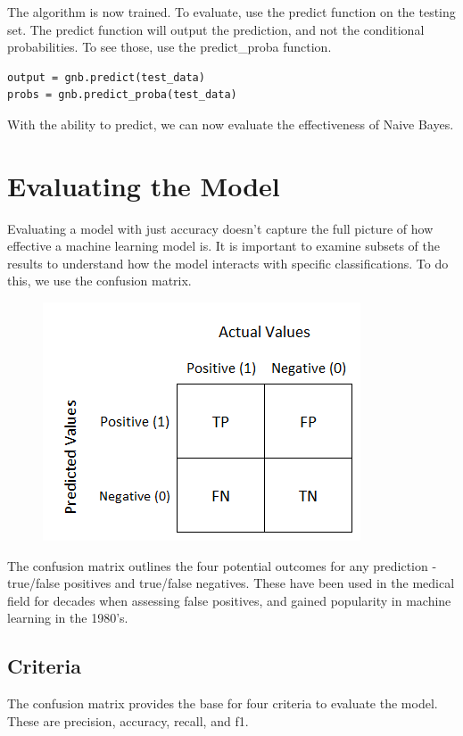 \documentclass[11pt, twoside, reqno]{book}
\begin{document}
The algorithm is now trained. To evaluate, use the predict function on the testing set. The predict function will output the prediction, and not the conditional probabilities. To see those, use the predict\_proba function. 
\begin{verbatim}
output = gnb.predict(test_data)
probs = gnb.predict_proba(test_data)
\end{verbatim}
With the ability to predict, we can now evaluate the effectiveness of Naive Bayes. 
 
\section{Evaluating the Model}
\hspace{0.2in} Evaluating a model with just accuracy doesn't capture the full picture of how effective a machine learning model is. It is important to examine subsets of the results to understand how the model interacts with specific classifications. To do this, we use the confusion matrix. 

\begin{figure}[H]
\label{fig:confmatrix}
\centering
	\includegraphics[scale=0.5]{confusion_matrix}
\end{figure}

The confusion matrix outlines the four potential outcomes for any prediction - true/false positives and true/false negatives. These have been used in the medical field for decades when assessing false positives, and gained popularity in machine learning in the 1980's. 

\subsection{Criteria}
\label{subsec:criteria}
\hspace{0.2in} The confusion matrix provides the base for four criteria to evaluate the model. These are precision, accuracy, recall, and f1.
\end{document}
